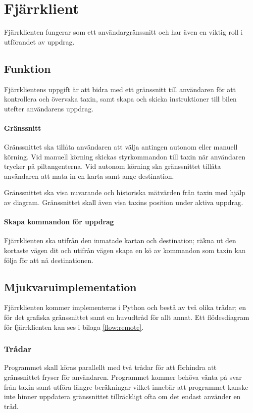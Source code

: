 \documentclass[designspec/spec.tex]{subfiles}
\begin{document}
\section{Fjärrklient}
Fjärrklienten fungerar som ett användargränssnitt och har även en
viktig roll i utförandet av uppdrag.

\subsection{Funktion}
Fjärrklientens uppgift är att bidra med ett gränssnitt till användaren för att
kontrollera och övervaka taxin, samt skapa och skicka instruktioner till bilen
utefter användarens uppdrag.

\paragraph{Gränssnitt}
Gränssnittet ska tillåta användaren att välja antingen autonom eller manuell
körning. Vid manuell körning skickas styrkommandon till taxin när användaren
trycker på piltangenterna. Vid autonom körning ska gränssnittet tillåta
användaren att mata in en karta samt ange destination.

Gränssnittet ska visa nuvarande och historiska mätvärden från taxin med hjälp
av diagram. Gränssnittet skall även visa taxins position under aktiva uppdrag.

\paragraph{Skapa kommandon för uppdrag}
Fjärrklienten ska utifrån den inmatade kartan och destination; räkna ut den
kortaste vägen dit och utifrån vägen skapa en kö av kommandon som taxin kan
följa för att nå destinationen.

\subsection{Mjukvaruimplementation}
Fjärrklienten kommer implementeras i Python och bestå av två olika trådar; en
för det grafiska gränssnittet samt en huvudtråd för allt annat. Ett
flödesdiagram för fjärrklienten kan ses i bilaga \ref{flow:remote}.

\subsubsection{Trådar}
Programmet skall köras parallellt med två trådar för att förhindra att
gränssnittet fryser för användaren. Programmet kommer behöva vänta på svar från
taxin samt utföra längre beräkningar vilket innebär att programmet kanske inte
hinner uppdatera gränssnittet tillräckligt ofta om det endast använder en tråd.
\end{document}
